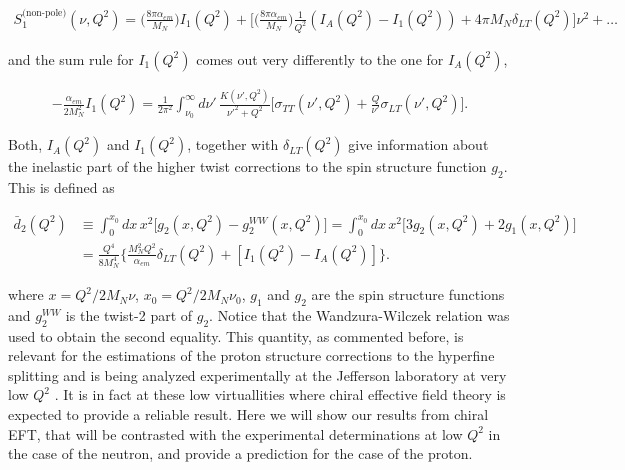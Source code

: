 \documentclass[prc,twocolumn,showpacs,preprintnumbers,amsmath,amssymb
,superscriptaddress,a4paper,nofootinbib
]{revtex4-1}
\begin{document}
\begin{widetext}
\begin{align}
S_1^{\text{(non-pole)}}(\nu,Q^2) =  \Big( \frac{8\pi\alpha_{em}}{M_N} \Big)  I_1(Q^2) + \Big[ \Big(\frac{8\pi \alpha_{em}}{M_N} \Big) \frac{1}{Q^2} (I_A(Q^2) - I_1(Q^2)) + 4\pi M_N \delta_{LT}(Q^2) \Big]\nu^2 + \dots\label{Eq:LEX-S1np}
\end{align}

and the sum rule for $I_1(Q^2)$ comes out very differently to the one for $I_A(Q^2)$,


\begin{align}
-\frac{\alpha_{em}}{2 M_N^2}I_1(Q^2) = \frac{1}{2 \pi^2} \int_{\nu_0}^\infty \!\!\!\! d\nu'\, \frac{K(\nu',Q^2)}{\nu'^2+Q^2} \Big[ \sigma_{TT} (\nu',Q^2) + \frac{Q}{\nu'} \sigma_{LT} (\nu',Q^2)\Big]. \label{Eq:I1-SumRule}
\end{align}


Both, $I_A(Q^2)$ and $I_1(Q^2)$, together with $\delta_{LT}(Q^2)$ give information about the inelastic part of the higher twist corrections to the spin structure function $g_2$.
This is defined as 

\begin{align}\label{Eq:d2inelDef}
 \bar{d}_2(Q^2) & \equiv \int_0^{x_0}\! dx \, x^2\Big[ g_2(x,Q^2) - g_2^{WW}(x,Q^2) \Big] = \int_0^{x_0}\! dx \, x^2\Big[ 3 g_2(x,Q^2) + 2 g_1(x,Q^2) \Big] \nonumber\\
 &= \frac{Q^4}{8 M_N^4}\Big\{ \frac{M_N^2 Q^2}{\alpha_{em}}\delta_{LT}(Q^2) +[I_1(Q^2) - I_A(Q^2)] \Big\}.
\end{align}

\end{widetext}
where $x=Q^2/2M_N \nu$, $x_0=Q^2/2M_N \nu_0$, $g_1$ and $g_2$ are the spin structure functions and $g_2^{WW}$ is the twist-2 part of $g_2$.
Notice that the Wandzura-Wilczek relation \cite{Wandzura:1977qf} was used to obtain the second equality.
This quantity, as commented before, is relevant for the estimations of the proton structure corrections to the hyperfine splitting and is being analyzed experimentally at the Jefferson laboratory at very low $Q^2$ \cite{Exp-new-E08-027,Exp-new-E97-110}.
It is in fact at these low virtuallities where chiral effective field theory is expected to provide a reliable result.
Here we will show our results from chiral EFT, that will be contrasted with the experimental determinations at low $Q^2$ in the case of the neutron, and provide a prediction for the case of the proton.
\end{document}
